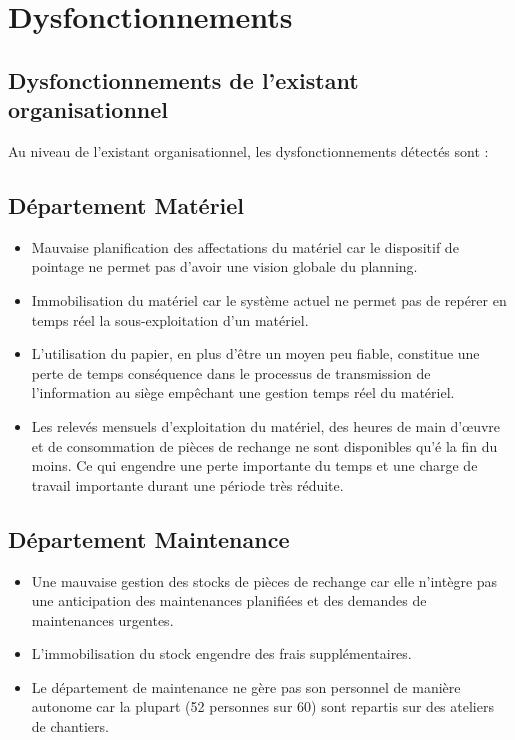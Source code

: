 		
		
\section{Dysfonctionnements}	
	\subsection{Dysfonctionnements de l'existant organisationnel}
		Au niveau de l'existant organisationnel, les dysfonctionnements détectés sont :
		
		\subsection{Département Matériel}
				\begin{itemize}
						\item Mauvaise planification des affectations du matériel car le dispositif de pointage ne permet pas d'avoir une vision globale du planning.
						\item Immobilisation du matériel car le système actuel ne permet pas de repérer en temps réel la sous-exploitation d'un matériel.
						\item L'utilisation du papier, en plus d'être un moyen peu fiable, constitue une perte de temps conséquence dans le processus de transmission de l'information au siège empêchant une gestion temps réel du matériel.
						\item Les relevés mensuels d'exploitation du matériel, des heures de main d'œuvre et de consommation de pièces de rechange ne sont disponibles qu'é la fin du moins. Ce qui engendre une perte importante du temps et une charge de travail importante durant une période très réduite.
				\end{itemize}
		
		\subsection{Département Maintenance}
				\begin{itemize}
						\item Une mauvaise gestion des stocks de pièces de rechange car elle n'intègre pas une anticipation des maintenances planifiées et des demandes de maintenances urgentes.
						\item L'immobilisation du stock engendre des frais supplémentaires.
						\item Le département de maintenance ne gère pas son personnel de manière autonome car la plupart (52 personnes sur 60) sont repartis sur des ateliers de chantiers.
				\end{itemize}
		
